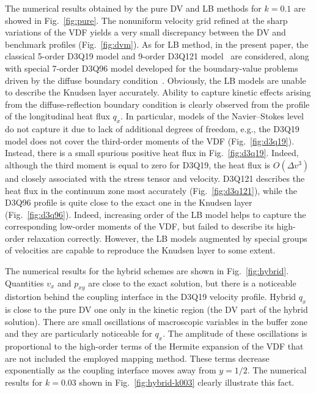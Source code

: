 \documentclass{elsarticle} %
\newcommand{\OO}[1]{O(#1)}
\begin{document}
The numerical results obtained by the pure DV and LB methods for \(k=0.1\) are showed in Fig.~\ref{fig:pure}.
The nonuniform velocity grid refined at the sharp variations of the VDF yields a very small discrepancy
between the DV and benchmark profiles (Fig.~\ref{fig:dvm}).
As for LB method, in the present paper, the classical 5-order D3Q19 model and 9-order D3Q121 model~\cite{Shan2010} are considered,
along with special 7-order D3Q96 model developed for the boundary-value problems driven by the diffuse boundary condition~\cite{Feuchter2016}.
Obviously, the LB models are unable to describe the Knudsen layer accurately.
Ability to capture kinetic effects arising from the diffuse-reflection boundary condition
is clearly observed from the profile of the longitudinal heat flux \(q_x\).
In particular, models of the Navier--Stokes level do not capture it due to lack of additional degrees of freedom,
e.g., the D3Q19 model does not cover the third-order moments of the VDF (Fig.~\ref{fig:d3q19}).
Instead, there is a small spurious positive heat flux in Fig.~\ref{fig:d3q19}.
Indeed, although the third moment is equal to zero for D3Q19,
the heat flux is \(\OO{\Delta v^3}\) and closely associated with the stress tensor and velocity.
D3Q121 describes the heat flux in the continuum zone most accurately (Fig.~\ref{fig:d3q121}),
while the D3Q96 profile is quite close to the exact one in the Knudsen layer (Fig.~\ref{fig:d3q96}).
Indeed, increasing order of the LB model helps to capture the corresponding low-order moments of the VDF,
but failed to describe its high-order relaxation correctly.
However, the LB models augmented by special groups of velocities are capable to reproduce the Knudsen layer to some extent.

The numerical results for the hybrid schemes are shown in Fig.~\ref{fig:hybrid}.
Quantities \(v_x\) and \(p_{xy}\) are close to the exact solution,
but there is a noticeable distortion behind the coupling interface in the D3Q19 velocity profile.
Hybrid \(q_x\) is close to the pure DV one only in the kinetic region (the DV part of the hybrid solution).
There are small oscillations of macroscopic variables in the buffer zone and they are particularly noticeable for \(q_x\).
The amplitude of these oscillations is proportional to the high-order terms of the Hermite expansion of the VDF
that are not included the employed mapping method.
These terms decrease exponentially as the coupling interface moves away from \(y=1/2\).
The numerical results for \(k=0.03\) shown in Fig.~\ref{fig:hybrid-k003} clearly illustrate this fact.
\end{document}
